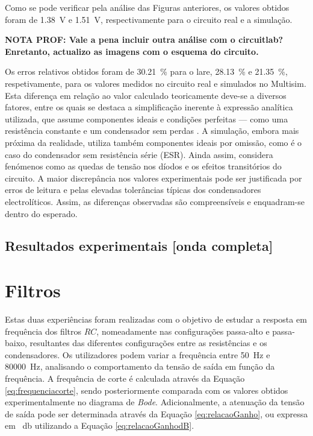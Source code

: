 Como se pode verificar pela análise das Figuras anteriores, os valores obtidos foram de \SI{1.38}{\volt} e \SI{1.51}{\volt}, respectivamente para o circuito real e a simulação.

\textbf{NOTA PROF: Vale a pena incluir outra análise com o circuitlab? Enretanto, actualizo as imagens com o esquema do circuito.}

Os erros relativos obtidos foram de \SI{30.21}{\percent} para o \acrshort{lare}, \SI{28.13}{\percent} e \SI{21.35}{\percent}, respetivamente, para os valores medidos no circuito real e simulados no Multisim. Esta diferença em relação ao valor calculado teoricamente deve-se a diversos fatores, entre os quais se destaca a simplificação inerente à expressão analítica utilizada, que assume componentes ideais e condições perfeitas — como uma resistência constante e um condensador sem perdas \cite{sedrasmith}. A simulação, embora mais próxima da realidade, utiliza também componentes ideais por omissão, como é o caso do condensador sem resistência série (ESR). Ainda assim, considera fenómenos como as quedas de tensão nos díodos e os efeitos transitórios do circuito. A maior discrepância nos valores experimentais pode ser justificada por erros de leitura e pelas elevadas tolerâncias típicas dos condensadores electrolíticos. Assim, as diferenças observadas são compreensíveis e enquadram-se dentro do esperado.

\subsection{Resultados experimentais [onda completa]}
\label{sec:resultados_RectificadoresOndacompleta}

\section{Filtros}
\label{sec:resultados_filtros}
Estas duas experiências foram realizadas com o objetivo de estudar a resposta em frequência dos filtros $RC$, nomeadamente nas configurações passa-alto e passa-baixo, resultantes das diferentes configurações entre as resistências e os condensadores. Os utilizadores podem variar a frequência entre \SI{50}{\hertz} e \SI{80000}{\hertz}, analisando o comportamento da tensão de saída em função da frequência. A frequência de corte é calculada através da Equação \ref{eq:frequenciacorte}, sendo posteriormente comparada com os valores obtidos experimentalmente no diagrama de \textit{Bode}. Adicionalmente, a atenuação da tensão de saída pode ser determinada através da Equação \ref{eq:relacaoGanho}, ou expressa em \SI{}{\decibel} utilizando a Equação \ref{eq:relacaoGanhodB}.

